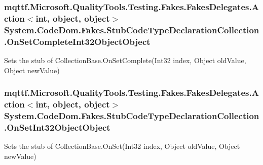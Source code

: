\hypertarget{class_system_1_1_code_dom_1_1_fakes_1_1_stub_code_type_declaration_collection_a842d39c00c6c9c03e054fe1469a475d1}{
\subsubsection[{On\-Set\-Complete\-Int32\-Object\-Object}]{\setlength{\rightskip}{0pt plus 5cm}mqttf.\-Microsoft.\-Quality\-Tools.\-Testing.\-Fakes.\-Fakes\-Delegates.\-Action$<$int, object, object$>$ System.\-Code\-Dom.\-Fakes.\-Stub\-Code\-Type\-Declaration\-Collection.\-On\-Set\-Complete\-Int32\-Object\-Object}}\label{class_system_1_1_code_dom_1_1_fakes_1_1_stub_code_type_declaration_collection_a842d39c00c6c9c03e054fe1469a475d1}


Sets the stub of Collection\-Base.\-On\-Set\-Complete(\-Int32 index, Object old\-Value, Object new\-Value)

\hypertarget{class_system_1_1_code_dom_1_1_fakes_1_1_stub_code_type_declaration_collection_aaccef39fed4d86ba5159b499aef8a5f4}{
\subsubsection[{On\-Set\-Int32\-Object\-Object}]{\setlength{\rightskip}{0pt plus 5cm}mqttf.\-Microsoft.\-Quality\-Tools.\-Testing.\-Fakes.\-Fakes\-Delegates.\-Action$<$int, object, object$>$ System.\-Code\-Dom.\-Fakes.\-Stub\-Code\-Type\-Declaration\-Collection.\-On\-Set\-Int32\-Object\-Object}}\label{class_system_1_1_code_dom_1_1_fakes_1_1_stub_code_type_declaration_collection_aaccef39fed4d86ba5159b499aef8a5f4}


Sets the stub of Collection\-Base.\-On\-Set(\-Int32 index, Object old\-Value, Object new\-Value)

